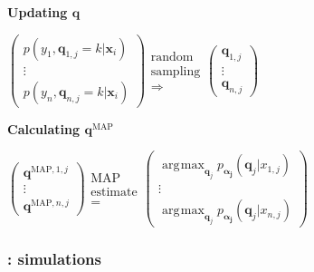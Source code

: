 \documentclass[english,xcolor={rgb,dvipsnames,table,usenames}, presentation]{beamer}
\DeclareMathOperator*{\argmax}{\arg\!\max}
\newcommand\q{{\bm{q}}}
\begin{document}
\begin{frame}
\medskip

\textbf{Updating $\q$}

\medskip

$\left( \begin{array}{c}
p(y_1,\q_{1,j}=k|\bm{x}_i)  \\
\vdots \\
p(y_n,\q_{n,j}=k|\bm{x}_i) \end{array} \right)
\begin{array}{c}
\text{random} \\
\text{sampling} \\
\Rightarrow \end{array}
\left( \begin{array}{ccc}
\q_{1,j}  \\
 \vdots \\
 \q_{n,j} \end{array} \right)$

\medskip

\textbf{Calculating $\q^{\text{MAP}}$}

\medskip

$\left( \begin{array}{c}
\q^{\text{MAP},1,j}  \\
\vdots \\
\q^{\text{MAP},n,j} \end{array} \right)
\begin{array}{c}
\text{MAP} \\
\text{estimate} \\
= \end{array}
\left( \begin{array}{ccc}
\argmax_{\q_j} p_{\bm{\alpha_j}}(\q_j | x_{1,j})  \\
 \vdots \\
\argmax_{\q_j} p_{\bm{\alpha_j}}(\q_j | x_{n,j}) \end{array} \right)$
 
 
\normalsize

\end{frame}






\begin{frame}
\frametitle{\secname : simulations}

\begin{figure}
\end{figure}

\end{frame}
\end{document}
